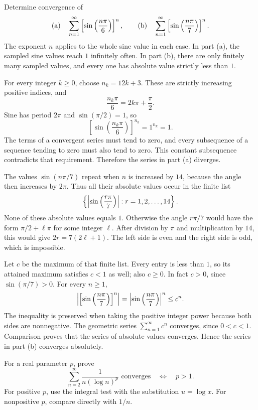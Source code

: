 \goal Determine convergence of
\[
 \textup{(a)}\quad\sum_{n=1}^{\infty}
       \left[\sin\left(\frac{n\pi}{6}\right)\right]^n,
 \qquad
 \textup{(b)}\quad\sum_{n=1}^{\infty}
       \left[\sin\left(\frac{n\pi}{7}\right)\right]^n.
\]
The exponent $n$ applies to the whole sine value in each case.
\idea In part (a), the sampled sine values reach $1$ infinitely
often. In part (b), there are only finitely many sampled values,
and every one has absolute value strictly less than $1$.

For every integer $k\ge0$, choose $n_k=12k+3$. These are strictly
increasing positive indices, and
\[
 \frac{n_k\pi}{6}=2k\pi+\frac{\pi}{2}.
\]
Sine has period $2\pi$ and $\sin(\pi/2)=1$, so
\[
 \left[\sin\left(\frac{n_k\pi}{6}\right)\right]^{n_k}
 =1^{n_k}=1.
\]
The terms of a convergent series must tend to zero, and every
subsequence of a sequence tending to zero must also tend to zero.
This constant subsequence contradicts that requirement. Therefore
the series in part (a) diverges.

The values $\sin(n\pi/7)$ repeat when $n$ is increased by $14$,
because the angle then increases by $2\pi$. Thus all their absolute
values occur in the finite list
\[
 \left\{\left|\sin\left(\frac{r\pi}{7}\right)\right|:
                  r=1,2,\ldots,14\right\}.
\]
None of these absolute values equals $1$. Otherwise the angle
$r\pi/7$ would have the form $\pi/2+\ell\pi$ for some integer
$\ell$. After division by $\pi$ and multiplication by $14$, this
would give $2r=7(2\ell+1)$. The left side is even and the right
side is odd, which is impossible.

Let $c$ be the maximum of that finite list. Every entry is less
than $1$, so its attained maximum satisfies $c<1$ as well; also
$c\ge0$. In fact $c>0$, since $\sin(\pi/7)>0$.
For every $n\ge1$,
\[
 \left|\left[\sin\left(\frac{n\pi}{7}\right)\right]^n\right|
 =\left|\sin\left(\frac{n\pi}{7}\right)\right|^n\le c^n.
\]
The inequality is preserved when taking the positive integer power
because both sides are nonnegative. The geometric series
$\sum_{n=1}^{\infty}c^n$ converges, since $0<c<1$. Comparison proves
that the series of absolute values converges. Hence the series in
part (b) converges absolutely.

\goal For a real parameter $p$, prove
\[
 \sum_{n=2}^{\infty}\frac{1}{n(\log n)^p}
 \text{ converges}\quad\Longleftrightarrow\quad p>1.
\]
\idea For positive $p$, use the integral test with the substitution
$u=\log x$. For nonpositive $p$, compare directly with $1/n$.

